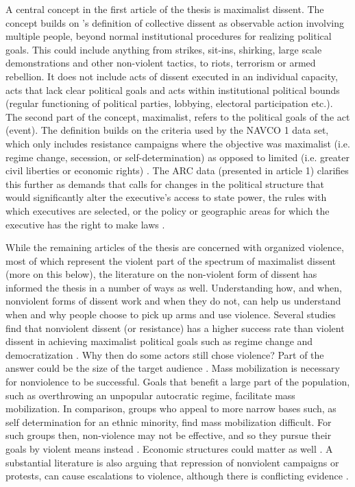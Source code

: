 
A central concept in the first article of the thesis is maximalist dissent. The
concept builds on \citet{TillyCharles1978Fmtr}'s definition of collective
dissent as observable action involving multiple people, beyond normal
institutional procedures for realizing political goals. This could include
anything from strikes, sit-ins, shirking, large scale demonstrations and other
non-violent tactics, to riots, terrorism or armed rebellion. It does not include
acts of dissent executed in an individual capacity, acts that lack clear
political goals and acts within institutional political bounds (regular
functioning of political parties, lobbying, electoral participation etc.). The
second part of the concept, maximalist, refers to the political goals of the act
(event). The definition builds on the criteria used by the NAVCO 1 data set,
which only includes resistance campaigns where the objective was maximalist
(i.e. regime change, secession, or self-determination) as opposed to limited
(i.e. greater civil liberties or economic rights)
\citep{DVN/0UZOTX/B4RH7S_2019}. The ARC data (presented in article 1) clarifies
this further as demands that calls for changes in the political structure that
would significantly alter the executive’s access to state power, the rules with
which executives are selected, or the policy or geographic areas for which the
executive has the right to make laws \citep{Butcher_2022}.

While the remaining articles of the thesis are concerned with organized
violence, most of which represent the violent part of the spectrum of maximalist
dissent (more on this below), the literature on the non-violent form of dissent
has informed the thesis in a number of ways as well. Understanding how, and
when, nonviolent forms of dissent work and when they do not, can help us
understand when and why people choose to pick up arms and use violence. Several
studies find that nonviolent dissent (or resistance) has a higher success rate
than violent dissent in achieving maximalist political goals
\citep{chenoweth2011civil, Stephan_2008} such as regime change and
democratization \citep{Celestino_2013, Bethke_2019}. Why then do some actors
still chose violence? Part of the answer could be the size of the target
audience \citep{Gleditsch_2021}. Mass mobilization is necessary for nonviolence
to be successful. Goals that benefit a large part of the population, such as
overthrowing an unpopular autocratic regime, facilitate mass mobilization. In
comparison, groups who appeal to more narrow bases such, as self determination
for an ethnic minority, find mass mobilization difficult. For such groups then,
non-violence may not be effective, and so they pursue their goals by violent
means instead \citep{Gleditsch_2021}. Economic structures could matter as well
\citep{Butcher_2014}. A substantial literature is also arguing that repression
of nonviolent campaigns or protests, can cause escalations to violence, although
there is conflicting evidence \citep{Chenoweth_2017, Lichbach_1987}.

